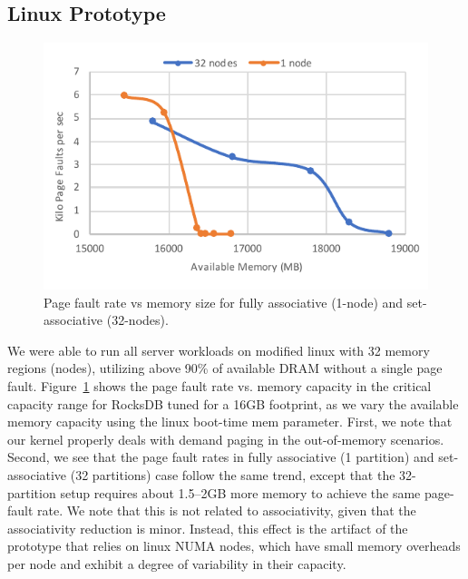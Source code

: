\subsection{Linux Prototype}
\begin{figure}[t]
   \centering
   \includegraphics[width=1.0\columnwidth]{graphs/realhw.pdf}
   \caption{Page fault rate vs memory size for fully associative (1-node) and set-associative (32-nodes).}
   \label{fig:realhw}
\end{figure}


We were able to run all server workloads on modified linux with 32 memory regions (nodes), utilizing above 90\% of available DRAM without a single page fault. Figure~\ref{fig:realhw} shows the page fault rate vs. memory capacity in the critical capacity range for RocksDB tuned for a 16GB footprint, as we vary the available memory capacity using the linux boot-time mem parameter. First, we note that our kernel properly deals with demand paging in the out-of-memory scenarios. Second, we see that the page fault rates in fully associative (1 partition) and set-associative (32 partitions) case follow the same trend, except that the 32-partition setup requires about 1.5--2GB more memory to achieve the same page-fault rate. We note that this is not related to associativity, given that the associativity reduction is minor. Instead, this effect is the artifact of the prototype that relies on linux NUMA nodes, which have small memory overheads per node and exhibit a degree of variability in their capacity. 

